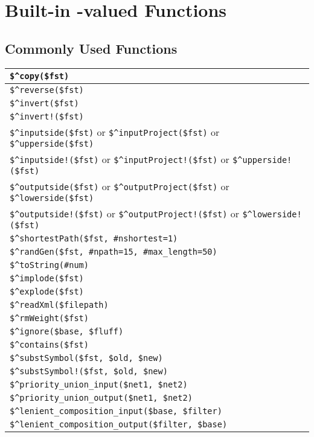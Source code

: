 \chapter{Built-in \fsm{}-valued Functions}

\section{Commonly Used Functions}

\begin{tabular}{|l|}
\hline
\verb!$^copy($fst)! \\
\hline
\verb!$^reverse($fst)! \\
\verb!$^invert($fst)!  \\
\verb+$^invert!($fst)+  \\
\verb!$^inputside($fst)!  or \verb!$^inputProject($fst)!  or \verb!$^upperside($fst)! \\
\verb+$^inputside!($fst)+  or \verb+$^inputProject!($fst)+  or \verb+$^upperside!($fst)+ \\
\verb!$^outputside($fst)! or \verb!$^outputProject($fst)! or \verb!$^lowerside($fst)! \\
\verb+$^outputside!($fst)+ or \verb+$^outputProject!($fst)+ or \verb+$^lowerside!($fst)+ \\
\verb!$^shortestPath($fst, #nshortest=1)!\\
\verb!$^randGen($fst, #npath=15, #max_length=50)!\\
\hline
\verb!$^toString(#num)! \\
\verb!$^implode($fst)! \\
\verb!$^explode($fst)! \\
\hline
\verb!$^readXml($filepath)! \\
\hline
\verb!$^rmWeight($fst)!\\
\hline
\verb!$^ignore($base, $fluff)! \\
\verb!$^contains($fst)! \\
\hline
\verb!$^substSymbol($fst, $old, $new)!\\
\verb/$^substSymbol!($fst, $old, $new)/\\
\hline
\verb!$^priority_union_input($net1, $net2)! \\
\verb!$^priority_union_output($net1, $net2)! \\
\verb!$^lenient_composition_input($base, $filter)! \\
\verb!$^lenient_composition_output($filter, $base)! \\
\hline
\end{tabular}

